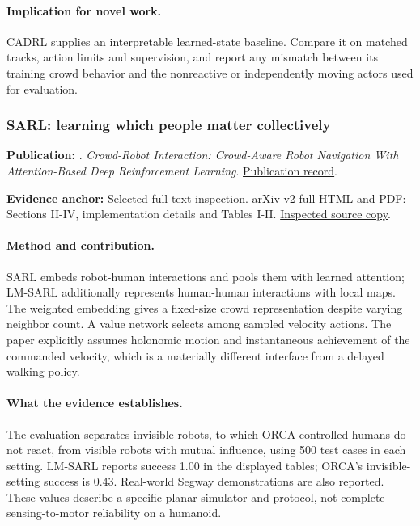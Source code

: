 \paragraph{Implication for novel work.} CADRL supplies an interpretable learned-state baseline. Compare it on matched tracks, action limits and supervision, and report any mismatch between its training crowd behavior and the nonreactive or independently moving actors used for evaluation.

\subsubsection{SARL: learning which people matter collectively}\label{paper:sarl}
\textbf{Publication:} \citet{sarl}. \emph{Crowd-Robot Interaction: Crowd-Aware Robot Navigation With Attention-Based Deep Reinforcement Learning}. \href{https://doi.org/10.1109/icra.2019.8794134}{Publication record}.

\textbf{Evidence anchor:} Selected full-text inspection. arXiv v2 full HTML and PDF: Sections II-IV, implementation details and Tables I-II. \href{https://arxiv.org/pdf/1809.08835}{Inspected source copy}.

\paragraph{Method and contribution.} SARL embeds robot-human interactions and pools them with learned attention; LM-SARL additionally represents human-human interactions with local maps. The weighted embedding gives a fixed-size crowd representation despite varying neighbor count. A value network selects among sampled velocity actions. The paper explicitly assumes holonomic motion and instantaneous achievement of the commanded velocity, which is a materially different interface from a delayed walking policy.

\paragraph{What the evidence establishes.} The evaluation separates invisible robots, to which ORCA-controlled humans do not react, from visible robots with mutual influence, using 500 test cases in each setting. LM-SARL reports success 1.00 in the displayed tables; ORCA's invisible-setting success is 0.43. Real-world Segway demonstrations are also reported. These values describe a specific planar simulator and protocol, not complete sensing-to-motor reliability on a humanoid.

